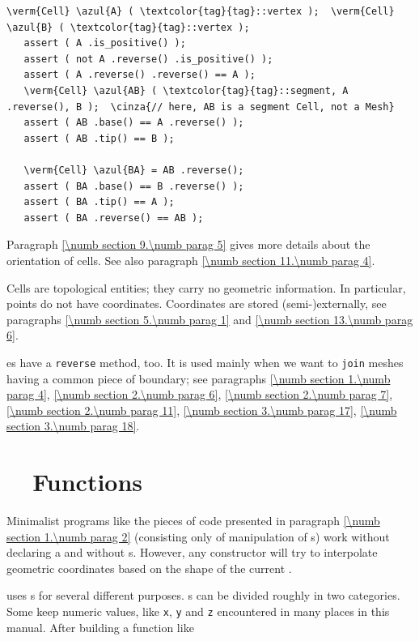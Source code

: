 \begin{Verbatim}[commandchars=\\\{\},formatcom=\small\tt,baselinestretch=0.94]
   \verm{Cell} \azul{A} ( \textcolor{tag}{tag}::vertex );  \verm{Cell} \azul{B} ( \textcolor{tag}{tag}::vertex );
   assert ( A .is_positive() );
   assert ( not A .reverse() .is_positive() );
   assert ( A .reverse() .reverse() == A );
   \verm{Cell} \azul{AB} ( \textcolor{tag}{tag}::segment, A .reverse(), B );  \cinza{// here, AB is a segment Cell, not a Mesh}
   assert ( AB .base() == A .reverse() );
   assert ( AB .tip() == B );

   \verm{Cell} \azul{BA} = AB .reverse();
   assert ( BA .base() == B .reverse() );
   assert ( BA .tip() == A );
   assert ( BA .reverse() == AB );
\end{Verbatim}

Paragraph \ref{\numb section 9.\numb parag 5} gives more details about the orientation of cells.
See also paragraph \ref{\numb section 11.\numb parag 4}.

Cells are topological entities; they carry no geometric information.
In particular, points do not have coordinates.
Coordinates are stored (semi-)externally, see paragraphs \ref{\numb section 5.\numb parag 1} and
\ref{\numb section 13.\numb parag 6}.

{\small\tt {}}es have a {\small\tt reverse} method, too.
It is used mainly when we want to {\small\tt join} meshes having a common piece of boundary;
see paragraphs \ref{\numb section 1.\numb parag 4}, \ref{\numb section 2.\numb parag 6},
\ref{\numb section 2.\numb parag 7}, \ref{\numb section 2.\numb parag 11},
\ref{\numb section 3.\numb parag 17}, \ref{\numb section 3.\numb parag 18}.


\section{~~Functions}\label{\numb section 1.\numb parag 3}

Minimalist programs like the pieces of code presented in paragraph
\ref{\numb section 1.\numb parag 2} (consisting only of manipulation of
{\small\tt{}}s) work without declaring a {\small\tt{}}
and without {\small\tt{}}s.
However, any {\small\tt{}} constructor will try to interpolate geometric coordinates
based on the shape of the current {\small\tt{}}.

{\ManiFEM} uses {\small\tt{}}s for several different purposes.
{\small\tt{}}s can be divided roughly in two categories.
Some keep numeric values, like {\small\tt x}, {\small\tt y} and {\small\tt z}
encountered in many places in this manual.
After building a function like

